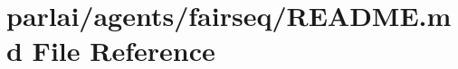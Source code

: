 \hypertarget{parlai_2agents_2fairseq_2README_8md}{}\section{parlai/agents/fairseq/\+R\+E\+A\+D\+ME.md File Reference}
\label{parlai_2agents_2fairseq_2README_8md}
